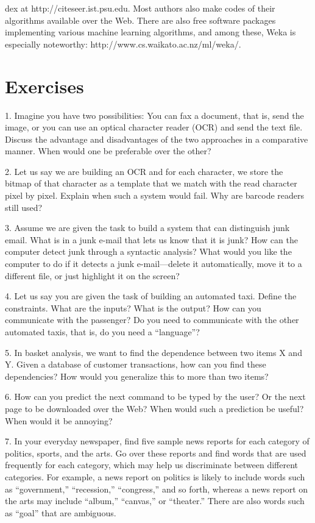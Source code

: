 dex at http://citeseer.ist.psu.edu. Most authors also make codes of their algorithms available over the Web. There are also free software packages implementing various machine learning algorithms, and among these, Weka is especially noteworthy: http://www.cs.waikato.ac.nz/ml/weka/.

\section{Exercises}

1. Imagine you have two possibilities: You can fax a document, that is, send the image, or you can use an optical character reader (OCR) and send the text file. Discuss the advantage and disadvantages of the two approaches in a comparative manner. When would one be preferable over the other?

2. Let us say we are building an OCR and for each character, we store the bitmap of that character as a template that we match with the read character pixel by pixel. Explain when such a system would fail. Why are barcode readers still used?

3. Assume we are given the task to build a system that can distinguish junk email. What is in a junk e-mail that lets us know that it is junk? How can the computer detect junk through a syntactic analysis? What would you like the computer to do if it detects a junk e-mail---delete it automatically, move it to a different file, or just highlight it on the screen?

4. Let us say you are given the task of building an automated taxi. Define the constraints. What are the inputs? What is the output? How can you communicate with the passenger? Do you need to communicate with the other automated taxis, that is, do you need a “language”?

5. In basket analysis, we want to find the dependence between two items X and Y. Given a database of customer transactions, how can you find these dependencies? How would you generalize this to more than two items?

6. How can you predict the next command to be typed by the user? Or the next page to be downloaded over the Web? When would such a prediction be useful? When would it be annoying?

7. In your everyday newspaper, find five sample news reports for each category of politics, sports, and the arts. Go over these reports and find words that are used frequently for each category, which may help us discriminate between different categories. For example, a news report on politics is likely to include words such as “government,” “recession,” “congress,” and so forth, whereas a news report on the arts may include “album,” “canvas,” or “theater.” There are also words such as “goal” that are ambiguous.

